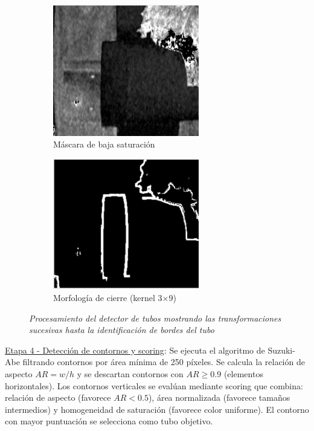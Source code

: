 \begin{figure}[H]
\begin{subfigure}[b]{0.48\textwidth}
    \centering
    \includegraphics[width=0.7\textwidth]{imagenes/detector_tubos_3_canal_s.png}
    \caption{Máscara de baja saturación}
\end{subfigure}
\hfill
\begin{subfigure}[b]{0.48\textwidth}
    \centering
    \includegraphics[width=0.7\textwidth]{imagenes/detector_tubos_5_morfologia.png}
    \caption{Morfología de cierre (kernel 3×9)}
\end{subfigure}

\vspace{0.3cm}

\caption{\textit{Procesamiento del detector de tubos mostrando las transformaciones sucesivas hasta la identificación de bordes del tubo}}
\label{fig:proceso_tubos}
\end{figure}

\underline{Etapa 4 - Detección de contornos y scoring}: Se ejecuta el algoritmo de Suzuki-Abe filtrando contornos por área mínima de 250 píxeles. Se calcula la relación de aspecto $AR = w/h$ y se descartan contornos con $AR \geq 0.9$ (elementos horizontales). Los contornos verticales se evalúan mediante scoring que combina: relación de aspecto (favorece $AR < 0.5$), área normalizada (favorece tamaños intermedios) y homogeneidad de saturación (favorece color uniforme). El contorno con mayor puntuación se selecciona como tubo objetivo.

